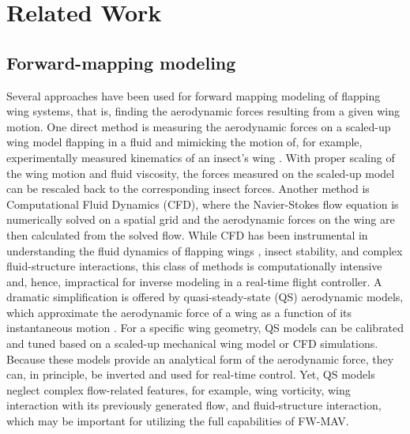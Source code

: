 \section{Related Work}
\subsection{Forward-mapping modeling}
 
 Several approaches have been used for forward mapping modeling of flapping wing systems, that is, finding the aerodynamic forces resulting from a given wing motion. One direct method is measuring the aerodynamic forces on a scaled-up wing model flapping in a fluid and mimicking the motion of, for example, experimentally measured kinematics of an insect's wing \citep{dickinson1999, Bayiz_Cheng_2021, whitney_wood_2010, ellington1996leading, muijres_flies_2014, hsu2019speed}. With proper scaling of the wing motion and fluid viscosity, the forces measured on the scaled-up model can be rescaled back to the corresponding insect forces.  
 Another method is Computational Fluid Dynamics (CFD), where the Navier-Stokes flow equation is numerically solved on a spatial grid and the aerodynamic forces on the wing are then calculated from the solved flow. While CFD has been instrumental in understanding the fluid dynamics of flapping wings \citep{dickinson2016aerodynamics,  nakata_liu_bomphrey_2015}, insect stability\citep{gao_perturbation_2011, sun2014insect, perl2023lateal}, and complex fluid-structure interactions\cite{young2009details, shyy2010recent, nakata2012fluidstructure, miller2009flexible}, this class of methods is computationally intensive and, hence, impractical for inverse modeling in a real-time flight controller. 
 A dramatic simplification is offered by quasi-steady-state (QS) aerodynamic models, which approximate the aerodynamic force of a wing as a function of its instantaneous motion \cite{dickinson1999, sane2002aerodynamic, weisFogh1973quick, whitney_wood_2010}. For a specific wing geometry, QS models can be calibrated and tuned based on a scaled-up mechanical wing model  \cite{dickinson1999, whitney_wood_2010} or CFD simulations\cite{nakata_liu_bomphrey_2015}. Because these models provide an analytical form of the aerodynamic force, they can, in principle, be inverted and used for real-time control. Yet, QS models neglect complex flow-related features, for example, wing vorticity, wing interaction with its previously generated flow, and fluid-structure interaction, which may be important for utilizing the full capabilities of FW-MAV.  

